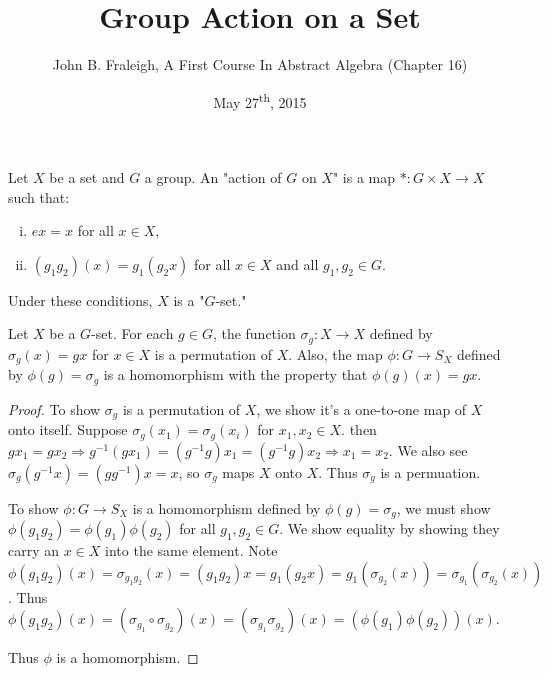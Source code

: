 \documentclass[a4paper,11pt]{article}
\title{Group Action on a Set}
\author{John B. Fraleigh, A First Course In Abstract Algebra (Chapter 16)}
\date{May 27\textsuperscript{th}, 2015}
\begin{document}
\maketitle
{}
\setlength\parindent{24pt}

\begin{outline}

    Let \(X\) be a set and \(G\) a group. An "action of \(G\) on \(X\)" is a map 
    \(*: G \times X \rightarrow X\) such that:
    \begin{enumerate}[i.]
      \item \(ex = x\) for all \(x \in X\),
      \item \((g_{1}g_{2})(x) = g_{1}(g_{2}x)\) for all \(x \in X\) and all \(g_{1}, g_{2} \in G\).
    \end{enumerate}
    Under these conditions, \(X\) is a "\(G\)-set."

    Let \(X\) be a \(G\)-set. For each \(g \in G\), the function \(\sigma_{g}: X \rightarrow X\)
    defined by \(\sigma_{g}(x) = gx\) for \(x \in X\) is a permutation of \(X\). Also, the map 
    \(\phi: G \rightarrow S_{X}\) defined by \(\phi(g) = \sigma_{g}\) is a homomorphism with the 
    property that \(\phi(g)(x) = gx\).
    
    \begin{proof}
      To show \(\sigma_{g}\) is a permutation of \(X\), we show it's a one-to-one map of \(X\) onto itself. Suppose
      \(\sigma_{g}(x_{1}) = \sigma_{g}(x_{i})\) for \(x_{1}, x_{2} \in X\). then \(gx_{1} = gx_{2} \Rightarrow 
      g^{-1}(gx_{1}) = (g^{-1}g)x_{1} = (g^{-1}g)x_{2} \Rightarrow x_{1} = x_{2}\). We also see \(\sigma_{g}(g^{-1}x) =
      (gg^{-1})x = x\), so \(\sigma_{g}\) maps \(X\) onto \(X\). Thus \(\sigma_{g}\) is a permuation.
      
      To show \(\phi: G \rightarrow S_{X}\) is a homomorphism defined by \(\phi(g) = \sigma_{g}\), we must show 
      \(\phi(g_{1}g_{2}) = \phi(g_{1})\phi(g_2)\) for all \(g_1, g_2 \in G\). We show equality by showing they carry an
      \(x \in X\) into the same element. Note \(\phi(g_1g_2)(x) = \sigma_{g_1g_2}(x) = (g_1g_2)x = g_1(g_2x) 
      = g_1(\sigma_{g_2}(x)) = \sigma_{g_1}(\sigma_{g_2}(x))\). Thus \(\phi(g_1g_2)(x) = 
      (\sigma_{g_1} \circ \sigma_{g_2})(x) = (\sigma_{g_1}\sigma_{g_2})(x) = (\phi(g_1)\phi(g_2))(x)\). 
      
      Thus \(\phi\) is a homomorphism.
    \end{proof}


\end{outline}
\end{document}
